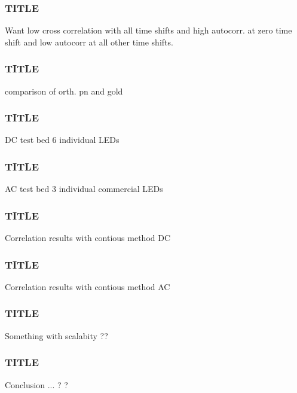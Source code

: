 \documentclass{beamer}
\begin{document}
	\begin{frame}\frametitle{TITLE}
		Want low cross correlation with all time shifts and high autocorr. at zero time shift and low autocorr at all other time shifts.
	\end{frame}

	\begin{frame}\frametitle{TITLE}
		comparison of orth. pn and gold
	\end{frame}




	\begin{frame}\frametitle{TITLE}
		DC test bed 6 individual LEDs
	\end{frame}

	\begin{frame}\frametitle{TITLE}
		AC test bed 3 individual commercial LEDs
	\end{frame}

	\begin{frame}\frametitle{TITLE}
		Correlation results with contious method DC
	\end{frame}

	\begin{frame}\frametitle{TITLE}
		Correlation results with contious method AC
	\end{frame}





	\begin{frame}\frametitle{TITLE}
		Something with scalabity ??
	\end{frame}


	\begin{frame}\frametitle{TITLE}
		Conclusion ... ? ? 
	\end{frame}
\end{document}
